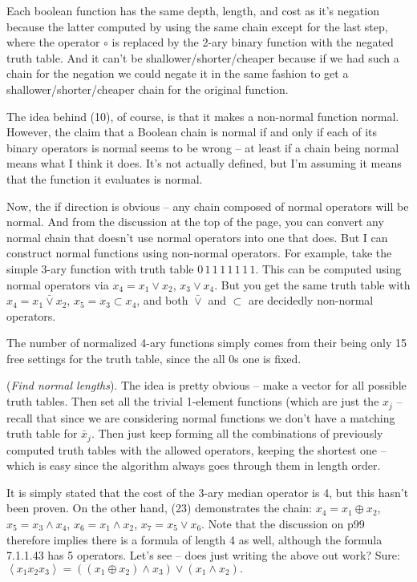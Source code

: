 \noindent [p 99] Each boolean function has the same depth, length,
and cost as it's negation because the latter computed by using the same
chain except for the last step, where the operator $\circ$ is replaced
by the 2-ary binary function with the negated truth table.  And it can't
be shallower/shorter/cheaper because if we had such a chain for the
negation we could negate it in the same fashion to get a shallower/shorter/cheaper
chain for the original function.

\vskip 0.05in  The idea behind (10),
of course, is that it makes a non-normal function normal.  However, the claim
that a Boolean chain is normal if and only if each of its binary operators is
normal seems to be wrong -- at least if a chain being normal means what
I think it does.  It's not actually defined, but I'm assuming it means that the
function it evaluates is normal.  

Now, the if direction is obvious -- any chain composed of normal operators
will be normal.  And from the discussion at the top of the page, you can convert
any normal chain that doesn't use normal operators into one that does.
But I can construct normal functions using non-normal operators.
For example, take the simple 3-ary function with truth table
$0\,1\,1\,1\,1\,1\,1\,1$.  This can be computed using normal
operators via $x_4 = x_1 \lor x_2$, $x_3 \lor x_4$.  But you get
the same truth table with $x_4 = x_1 \bar \lor x_2$, $x_5 = x_3 \subset x_4$,
and both $\bar \lor$ and $\subset$ are decidedly non-normal operators.

The number of normalized 4-ary functions simply comes from their being
only 15 free settings for the truth table, since the all 0s one is fixed.

\vskip 0.05in  ({\it Find normal lengths}).\hfil\break
The idea is pretty obvious -- make a vector for all possible truth tables.
Then set all the trivial 1-element functions (which are just the $x_j$ --
recall that since we are considering normal functions we don't have
a matching truth table for $\bar x_j$.  Then just keep forming all the
combinations of previously computed truth tables with the allowed operators,
keeping the shortest one -- which is easy since the algorithm always goes
through them in length order.

\vskip 0.1in 

\noindent [p 107] It is simply stated that the cost of the 3-ary median
operator is 4, but this hasn't been proven.  On the other hand, (23)
demonstrates the chain: $x_4 = x_1 \oplus x_2$, $x_5 = x_3 \land x_4$,
$x_6 = x_1 \land x_2$, $x_7 = x_5 \lor x_6$.  Note that the discussion
on p99 therefore implies there is a formula of length 4 as well, although
the formula 7.1.1.43 has 5 operators.  Let's see -- does just writing
the above out work?  Sure:
$
\left< x_1 x_2 x_3 \right> = \left(\left(x_1 \oplus x_2\right) \land x_3\right)
\lor \left(x_1 \land x_2\right).
$


